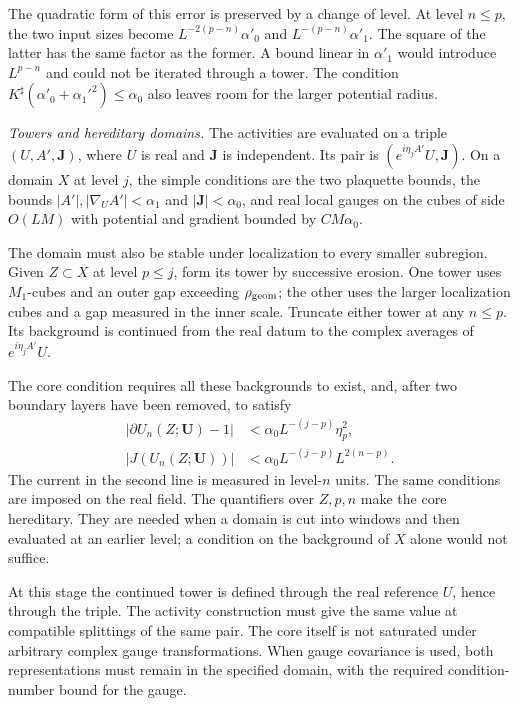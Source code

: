 \documentclass[11pt,letterpaper,reqno]{amsart}
\theoremstyle{definition}
\theoremstyle{remark}
\begin{document}
The quadratic form of this error is preserved by a
change of level. At level $n\le p$, the two input
sizes become
$L^{-2(p-n)}\alpha'_0$ and
$L^{-(p-n)}\alpha'_1$. The square of the latter has
the same factor as the former. A bound linear in
$\alpha'_1$ would introduce $L^{p-n}$ and could not
be iterated through a tower. The condition
$K^\sharp(\alpha'_0+\alpha_1'^2)\le\alpha_0$ also
leaves room for the larger potential radius.

\emph{Towers and hereditary domains.}
The activities are evaluated on a triple
$(U,A',\mathbf J)$, where $U$ is real and
$\mathbf J$ is independent. Its pair is
$(e^{i\eta_jA'}U,\mathbf J)$. On a domain $X$ at
level $j$, the simple conditions are the two
plaquette bounds, the bounds
$|A'|,|\nabla_UA'|<\alpha_1$ and
$|\mathbf J|<\alpha_0$, and real local gauges on
the cubes of side $O(LM)$ with potential and
gradient bounded by $CM\alpha_0$.

The domain must also be stable under localization
to every smaller subregion. Given $Z\subset X$
at level $p\le j$, form its tower by successive
erosion. One tower uses $M_1$-cubes and an outer
gap exceeding $\rho_{\rm geom}$; the other uses
the larger localization cubes and a gap measured
in the inner scale. Truncate either tower at
any $n\le p$. Its background is continued from
the real datum to the complex averages of
$e^{i\eta_jA'}U$.

The core condition requires all these backgrounds
to exist, and, after two boundary layers have
been removed, to satisfy
\[
 \begin{split}
 |\partial U_n(Z;\mathbf U)-1|
       &<\alpha_0L^{-(j-p)}\eta_p^2,\\
 |J(U_n(Z;\mathbf U))|
       &<\alpha_0L^{-(j-p)}L^{2(n-p)}.
 \end{split}
\]
The current in the second line is measured in
level-$n$ units. The same conditions are imposed
on the real field. The quantifiers over $Z,p,n$
make the core hereditary. They are needed when
a domain is cut into windows and then evaluated
at an earlier level; a condition on the
background of $X$ alone would not suffice.

At this stage the continued tower is defined
through the real reference $U$, hence through
the triple. The activity construction must
give the same value at compatible splittings
of the same pair. The core itself is not
saturated under arbitrary complex gauge
transformations. When gauge covariance is
used, both representations must remain in
the specified domain, with the required
condition-number bound for the gauge.
\end{document}

